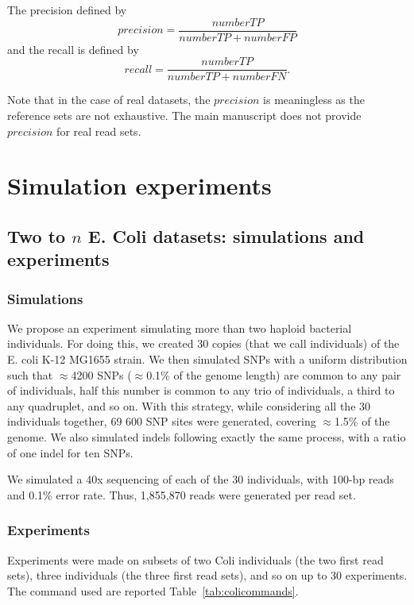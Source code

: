 \documentclass{bmcart}
\begin{document}
The precision defined by $$precision=\frac{number TP}{number TP+ number FP}$$ and the recall is defined by $$recall=\frac{number TP}{number TP+ number FN}.$$

Note that in the case of real datasets, the $precision$ is meaningless as the reference sets are not exhaustive. The main manuscript does not provide $precision$ for real read sets.

\section*{Simulation experiments}


\subsection*{Two to $n$ E. Coli datasets: simulations and experiments}
\subsubsection*{Simulations}
We propose an experiment simulating more than two haploid bacterial individuals. For doing this, we created 30 copies (that we call individuals) of the E. coli K-12 MG1655 strain. We then simulated SNPs with a uniform distribution such that $\approx$4200 SNPs ($\approx$0.1\% of the genome length) are common to any pair of individuals, half this number is common to any trio of individuals, a third to any quadruplet, and so on. With this strategy, while considering all the 30 individuals together, 69 600 SNP sites were generated, covering $\approx$1.5\% of the genome. We also simulated indels following exactly the same process, with a ratio of one indel for ten SNPs. 

We simulated a 40x sequencing of each of the 30 individuals, with 100-bp reads and 0.1\% error rate. Thus, 1,855,870 reads were generated per read set. 

\subsubsection*{Experiments}
Experiments were made on subsets of two Coli individuals (the two first read sets), three individuals (the three first read sets), and so on up to 30 experiments. The command used are reported Table~\ref{tab:colicommands}. 
\end{document}
